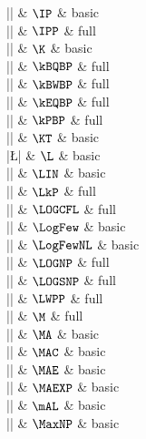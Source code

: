 |\IP|    & $\IP$ & basic \\

|\IPP|    & $\IPP$ & full \\

|\K|    & $\K$ & basic \\

|\kBQBP|    & $\kBQBP$ & full \\

|\kBWBP|    & $\kBWBP$ & full \\

|\kEQBP|    & $\kEQBP$ & full \\

|\kPBP|    & $\kPBP$ & full \\

|\KT|    & $\KT$ & basic \\

|\L|    & $\L$ & basic \\

|\LIN|    & $\LIN$ & basic \\

|\LkP|    & $\LkP$ & full \\

|\LOGCFL|    & $\LOGCFL$ & full \\

|\LogFew|    & $\LogFew$ & basic \\

|\LogFewNL|    & $\LogFewNL$ & basic \\

|\LOGNP|    & $\LOGNP$ & full \\

|\LOGSNP|    & $\LOGSNP$ & full \\

|\LWPP|    & $\LWPP$ & full \\

|\M|    & $\M$ & full \\

|\MA|    & $\MA$ & basic \\

|\MAC|    & $\MAC$ & basic \\

|\MAE|    & $\MAE$ & basic \\

|\MAEXP|    & $\MAEXP$ & basic \\

|\mAL|    & $\mAL$ & basic \\

|\MaxNP|    & $\MaxNP$ & basic \\

